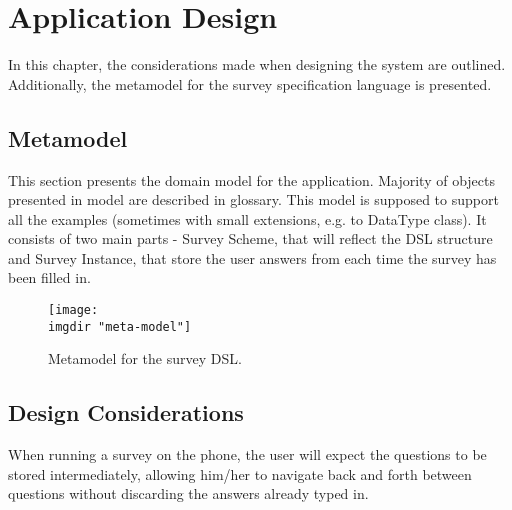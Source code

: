 \chapter{Application Design}
\label{chap:design}
In this chapter, the considerations made when designing the system are outlined. Additionally, the metamodel for the survey specification language is presented.

\section{Metamodel}
\label{sec:metamodel}
This section presents the domain model for the application. Majority of objects presented in model are described in glossary. This model is supposed to support all the examples (sometimes with small extensions, e.g. to DataType class). It consists of two main parts - Survey Scheme, that will reflect the DSL structure and Survey Instance, that store the user answers from each time the survey has been filled in.

\begin{figure}
  \texttt{[image: \\imgdir "meta-model"]}
  \caption{Metamodel for the survey DSL.}
  \label{fig:metamodel}
\end{figure}


\section{Design Considerations}
\label{sec:designconsiderations}
When running a survey on the phone, the user will expect the questions to be stored intermediately, allowing him/her to navigate back and forth between questions without discarding the answers already typed in.

\begin{center}
 \hspace{10mm}
\end{center}
